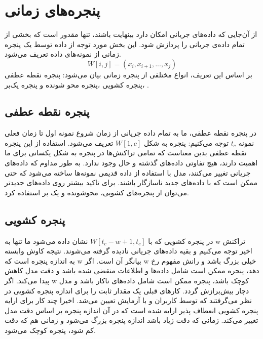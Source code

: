 \section{پنجره‌های زمانی}
از آن‌جایی که داده‌های جریانی امکان دارد بینهایت باشند، تنها مقدور است که بخشی از تمام داده‌ی جریانی را پردازش شود. این بخش مورد توجه از داده توسط یک پنجره زمانی از نمونه‌های داده تعریف می‌شود.
\begin{equation}
W[i, j] = (x_i, x_{i+1}, ..., x_j)
\end{equation}
بر اساس این تعریف، انواع مختلفی از پنجره زمانی بیان‌ می‌شود: پنجره نقطه عطفی
،پنجره کشویی
،پنجره محو شونده
و پنجره یک‌بر
.

\subsection{پنجره نقطه عطفی}
در پنجره نقطه عطقی، ما به تمام داده جریانی از زمان شروع نمونه اول تا زمان فعلی نمونه $ t_c $ توجه می‌کنیم: پنجره به شکل $ W[1, c] $ تعریف می‌شود. استفاده از این پنجره نقطه عطفی بدین معناست که تمامی تراکنش‌ها در پنجره به شکل یکسانی برای ما اهمیت دارند، هیچ تفاوتی داده‌های گذشته و حال وجود ندارد. به طور مداوم که داده‌های جریانی تغییر می‌کنند، مدل با استفاده از داده قدیمی نمونه‌ها ساخته می‌شود که حتی ممکن است که با داده‌های جدید ناسازگار باشند. برای تاکید بیشتر روی داده‌های جدیدتر می‌توان از پنجره‌های کشویی، محوشونده و یک بر استفاده کرد.
\subsection{پنجره کشویی}
   در پنجره کشویی که با
$W[t_c - w + 1, t_c]$
 نشان داده می‌شود ما تنها به w تراکنش اخیر توجه می‌کنیم و بقیه داده‌های جریانی نادیده گرفته‌ می‌شوند. نتیجه کاوش وابسته به اندازه پنجره است که w بیانگر آن است. اگر w خیلی بزرگ باشد و رانش مفهوم رخ دهد، پنحره ممکن است شامل داده‌‌ها و اطلاعات منقضی شده باشد و دقت مدل کاهش پیدا می‌کند. اگر w کوچک باشد، پنجره ممکن است شامل داده‌های ناکار باشد و مدل دچار بیش‌برازش گردد.
کارهای قبلی یک مقدار ثابت را برای اندازه پنجره کشویی در نظر‌ می‌گرفتند که توسط کاربران و با آزمایش تعیین می‌شد. اخیرا چند کار برای ارایه پنجره کشویی انعطاف پذیر ارایه شده است که در آن اندازه پنجره بر اساس دقت مدل تغییر می‌کند. زمانی که دقت زیاد باشد اندازه پنجره بزرگ می‌شود و زمانی هم که دقت کم شود، پنجره کوچک می‌شود.

